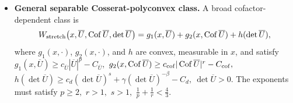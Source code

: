 \documentclass[11pt]{article}
\DeclareMathOperator{\Cof}{Cof}
\begin{document}
\begin{footnotesize}
\begin{itemize}
\item \textbf{General separable Cosserat-polyconvex class.}
A broad cofactor-dependent class is
\begin{align}
        W_{\rm stretch}\bigl(x,\overline U,\Cof \overline U,\det \overline U\bigr)
        =
        g_1(x,\overline U)
        +
        g_2(x,\Cof \overline U)
        +
        h(\det \overline U),
\end{align}
where $g_1(x,\cdot)$, $g_2(x,\cdot)$, and $h$ are convex, measurable in $x$,
and satisfy
$
        g_1(x,\overline U)\geq c_{\overline U} | \overline U | ^p-C_{\overline U},
$
$
        g_2(x,\Cof \overline U)\geq c_{\rm cof} | \Cof \overline U | ^r-C_{\rm cof},
$
$
        h(\det \overline U)
        \geq
        c_d(\det \overline U)^s
        +
        \gamma(\det \overline U)^{-\beta}
        -
        C_d,
        \  
        \det \overline U>0.
$
The exponents must satisfy
$
        p\geq2,
         $ $
        r>1,
        $ $
        s>1,
      $ $
        \frac1p+\frac1r<\frac43.
$

\end{itemize}


\end{footnotesize}  
\end{document}
